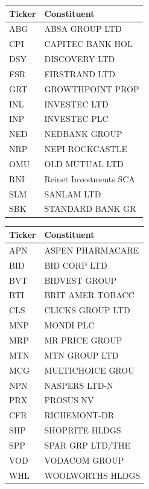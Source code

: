 \documentclass[11pt,preprint, authoryear]{elsarticle}
\let\origtable\table
\let\endorigtable\endtable
\renewenvironment{table}[1][2] {
    \expandafter\origtable\expandafter[H]
} {
    \endorigtable
}
\numberwithin{equation}{section}
\numberwithin{figure}{section}
\numberwithin{table}{section}
\begin{document}
\begin{table}[H]

\caption{\label{tab:T40 constituents}T40 Constituents: Financials}
\centering
\begin{tabular}[t]{l|l}
\hline
Ticker & Constituent\\
\hline
ABG & ABSA GROUP LTD\\
\hline
CPI & CAPITEC BANK HOL\\
\hline
DSY & DISCOVERY LTD\\
\hline
FSR & FIRSTRAND LTD\\
\hline
GRT & GROWTHPOINT PROP\\
\hline
INL & INVESTEC LTD\\
\hline
INP & INVESTEC PLC\\
\hline
NED & NEDBANK GROUP\\
\hline
NRP & NEPI ROCKCASTLE\\
\hline
OMU & OLD MUTUAL LTD\\
\hline
RNI & Reinet Investments SCA\\
\hline
SLM & SANLAM LTD\\
\hline
SBK & STANDARD BANK GR\\
\hline
\end{tabular}
\end{table}

\begin{table}[H]

\caption{\label{tab:unnamed-chunk-1}T40 Constituents: Industrials}
\centering
\begin{tabular}[t]{l|l}
\hline
Ticker & Constituent\\
\hline
APN & ASPEN PHARMACARE\\
\hline
BID & BID CORP LTD\\
\hline
BVT & BIDVEST GROUP\\
\hline
BTI & BRIT AMER TOBACC\\
\hline
CLS & CLICKS GROUP LTD\\
\hline
MNP & MONDI PLC\\
\hline
MRP & MR PRICE GROUP\\
\hline
MTN & MTN GROUP LTD\\
\hline
MCG & MULTICHOICE GROU\\
\hline
NPN & NASPERS LTD-N\\
\hline
PRX & PROSUS NV\\
\hline
CFR & RICHEMONT-DR\\
\hline
SHP & SHOPRITE HLDGS\\
\hline
SPP & SPAR GRP LTD/THE\\
\hline
VOD & VODACOM GROUP\\
\hline
WHL & WOOLWORTHS HLDGS\\
\hline
\end{tabular}
\end{table}
\end{document}
